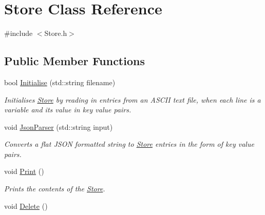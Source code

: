 \hypertarget{classStore}{\section{Store Class Reference}
\label{classStore}
}


{\ttfamily \#include $<$Store.\-h$>$}

\subsection*{Public Member Functions}
\begin{DoxyCompactItemize}
\item 
bool \hyperlink{classStore_a5247080901fb214804d0191681a30a83}{Initialise} (std\-::string filename)
\begin{DoxyCompactList}\small\item\em Initialises \hyperlink{classStore}{Store} by reading in entries from an A\-S\-C\-I\-I text file, when each line is a variable and its value in key value pairs. \end{DoxyCompactList}\item 
void \hyperlink{classStore_adb84e3fb286cae07f64e8186b7ab04e1}{Json\-Parser} (std\-::string input)
\begin{DoxyCompactList}\small\item\em Converts a flat J\-S\-O\-N formatted string to \hyperlink{classStore}{Store} entries in the form of key value pairs. \end{DoxyCompactList}\item 
\hypertarget{classStore_a9d2f000bd849a9f5de71c3ba62dca340}{void \hyperlink{classStore_a9d2f000bd849a9f5de71c3ba62dca340}{Print} ()}\label{classStore_a9d2f000bd849a9f5de71c3ba62dca340}

\begin{DoxyCompactList}\small\item\em Prints the contents of the \hyperlink{classStore}{Store}. \end{DoxyCompactList}\item 
\hypertarget{classStore_a7fce0f8f3ec7978c5e7cd3d7053f899b}{void \hyperlink{classStore_a7fce0f8f3ec7978c5e7cd3d7053f899b}{Delete} ()}\label{classStore_a7fce0f8f3ec7978c5e7cd3d7053f899b}


\end{DoxyCompactItemize}
